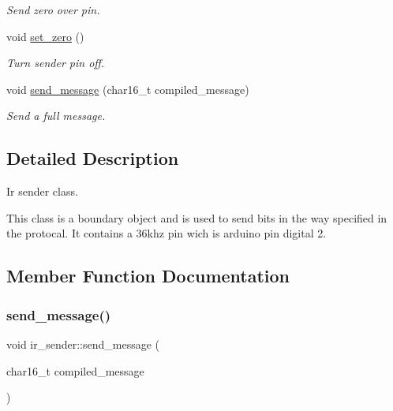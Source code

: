 \begin{DoxyCompactItemize}
\begin{DoxyCompactList}\small\item\em Send zero over pin. \end{DoxyCompactList}\item 
void \hyperlink{classir__sender_aa38f450682d96d47347dceefb7167976}{set\+\_\+zero} ()
\begin{DoxyCompactList}\small\item\em Turn sender pin off. \end{DoxyCompactList}\item 
void \hyperlink{classir__sender_a6b23d2e93be4f000ca689395613ea487}{send\+\_\+message} (char16\+\_\+t compiled\+\_\+message)
\begin{DoxyCompactList}\small\item\em Send a full message. \end{DoxyCompactList}\end{DoxyCompactItemize}


\subsection{Detailed Description}
Ir sender class. 

This class is a boundary object and is used to send bits in the way specified in the protocal. It contains a 36khz pin wich is arduino pin digital 2. 

\subsection{Member Function Documentation}
\hypertarget{classir__sender_a6b23d2e93be4f000ca689395613ea487}{}\label{classir__sender_a6b23d2e93be4f000ca689395613ea487} 
\subsubsection{\texorpdfstring{send\+\_\+message()}{send\_message()}\hspace{0.1cm}{\footnotesize\ttfamily [1/2]}}
{\footnotesize\ttfamily void ir\+\_\+sender\+::send\+\_\+message (\begin{DoxyParamCaption}\item[{char16\+\_\+t}]{compiled\+\_\+message }\end{DoxyParamCaption})\hspace{0.3cm}{\ttfamily [inline]}}



